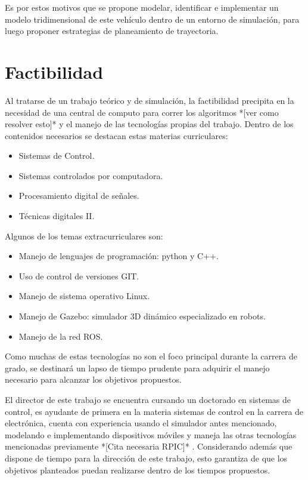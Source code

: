 \documentclass[12pt,a4paper,onecolumn]{article}%
\begin{document}
 Es por estos motivos que se propone modelar, identificar e implementar un modelo tridimensional de este vehículo dentro de un entorno de simulación, para luego proponer  estrategias de planeamiento de trayectoria.  
 
  
\section{Factibilidad}
Al tratarse de un trabajo teórico y de simulación, la factibilidad precipita en la necesidad de una central de computo para correr los algoritmos *[ver como resolver esto]* y el manejo de las tecnologías propias del trabajo. Dentro de los contenidos necesarios se destacan estas materias curriculares:
\begin{itemize}
\item Sistemas de Control.
\item Sistemas controlados por computadora.
\item Procesamiento digital de señales.
\item Técnicas digitales II.
\end{itemize}

Algunos de los temas extracurriculares son:
\begin{itemize}
\item Manejo de lenguajes de programación: python y C++.
\item Uso de control de versiones GIT.
\item Manejo de sistema operativo Linux.
\item Manejo de Gazebo: simulador 3D dinámico especializado en robots.
\item Manejo de la red ROS.
\end{itemize}

Como muchas de estas tecnologías no son el foco principal durante la carrera de grado, se destinará un lapso de tiempo prudente para adquirir el manejo necesario para alcanzar los objetivos propuestos. 

El director de este trabajo se encuentra cursando un doctorado en sistemas de control, es ayudante de primera en la materia sistemas de control en la carrera de electrónica, cuenta con experiencia usando el simulador antes mencionado, modelando e implementando dispositivos móviles  y maneja las otras tecnologías mencionadas previamente *[Cita necesaria RPIC]* . Considerando además que dispone de tiempo para la dirección de este trabajo, esto garantiza de que los objetivos planteados puedan realizarse dentro de los tiempos propuestos. 
\end{document}
